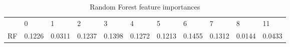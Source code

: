 \begin{table}[]
\centering
\caption{Random Forest feature importances}
\label{table:rf}
\begin{tabular}{lllllllllll}
   & 0      & 1      & 2      & 3      & 4      & 5      & 6      & 7      & 8      & 11     \\
RF & 0.1226 & 0.0311 & 0.1237 & 0.1398 & 0.1272 & 0.1213 & 0.1455 & 0.1312 & 0.0144 & 0.0433
\end{tabular}
\end{table}


